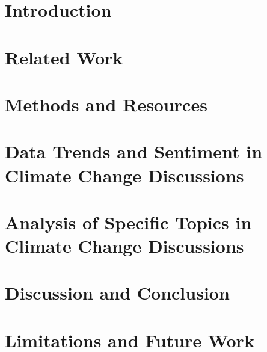 \documentclass[11pt,a4paper,twoside,openright]{scrbook}
\begin{document}
\deckblatt

\pagestyle{scrheadings}

\erklaerung

\thispagestyle{scrplain}
\noindent



\tableofcontents


\chapter{Introduction}


\chapter{Related Work}


\chapter{Methods and Resources}


\chapter{Data Trends and Sentiment in Climate Change Discussions}


\chapter{Analysis of Specific Topics in Climate Change Discussions}


\chapter{Discussion and Conclusion}


\chapter{Limitations and Future Work}



\newpage



\newpage
\end{document}
